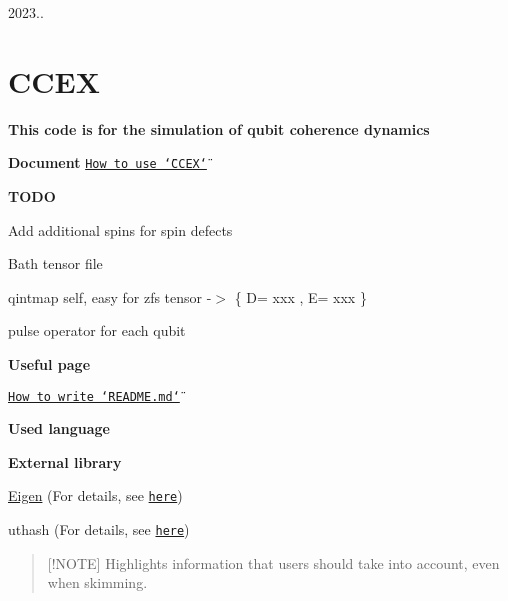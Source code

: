 2023..

\section*{C\-C\-E\-X   }

\par
 {\bfseries This code is for the simulation of qubit coherence dynamics\par
}

{\bfseries Document} \href{https://ccex-huijinparks-projects.vercel.app/index.html}{\tt How to use \char`\"{}\-C\-C\-E\-X\char`\"{}}

{\bfseries T\-O\-D\-O}
\begin{DoxyItemize}
\item Add additional spins for spin defects
\item Bath tensor file
\item qintmap self, easy for zfs tensor -\/$>$ \{ D= xxx , E= xxx \}
\item pulse operator for each qubit \par

\end{DoxyItemize}

{\bfseries Useful page}
\begin{DoxyItemize}
\item \href{https://docs.github.com/ko/get-started/writing-on-github/getting-started-with-writing-and-formatting-on-github/basic-writing-and-formatting-syntax}{\tt How to write \char`\"{}\-R\-E\-A\-D\-M\-E.\-md\char`\"{}}
\end{DoxyItemize}

{\bfseries Used language}\par
     \par


{\bfseries External library}\par
 \hyperlink{namespaceEigen}{Eigen} (For details, see \href{https://eigen.tuxfamily.org/index.php?title=Main_Page}{\tt here})\par
 uthash (For details, see \href{https://troydhanson.github.io/uthash/userguide.html#_a_hash_in_c}{\tt here})\par
 \par


\begin{quotation}
\mbox{[}!\-N\-O\-T\-E\mbox{]} Highlights information that users should take into account, even when skimming.

\end{quotation}


